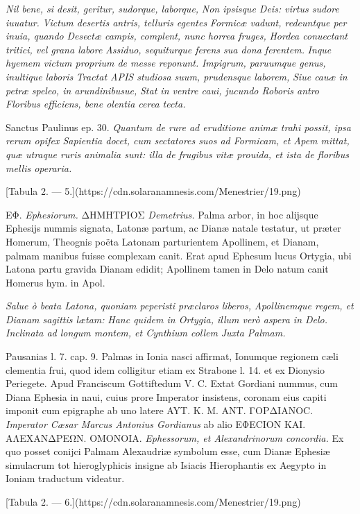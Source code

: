 \documentclass[a4paper, 11pt, oneside, polutonikogreek, latin]{article}
\begin{document}
\emph{Nil bene, si desit, geritur, sudorque, laborque,}
\emph{Non ipsisque Deis: virtus sudore iuuatur.}
\emph{Victum desertis antris, telluris egentes}
\emph{Formicæ vadunt, redeuntque per inuia, quando}
\emph{Desectæ campis, complent, nunc horrea fruges,}
\emph{Hordea conuectant tritici, vel grana labore}
\emph{Assiduo, sequiturque ferens sua dona ferentem.}
\emph{Inque hyemem victum proprium de messe reponunt.}
\emph{Impigrum, paruumque genus, inultique laboris}
\emph{Tractat APIS studiosa suum, prudensque laborem,}
\emph{Siue cauæ in petræ speleo, in arundinibusue,}
\emph{Stat in ventre caui, jucundo Roboris antro}
\emph{Floribus efficiens, bene olentia cerea tecta.}

Sanctus Paulinus ep. 30. \emph{Quantum de rure ad eruditione animæ trahi possit, ipsa rerum opifex Sapientia docet, cum sectatores suos ad Formicam, et Apem mittat, quæ utraque ruris animalia sunt: illa de frugibus vitæ prouida, et ista de floribus mellis operaria.}

[Tabula 2. --- 5.](https://cdn.solaranamnesis.com/Menestrier/19.png)

EΦ. \emph{Ephesiorum.} ΔHMHTPIOΣ \emph{Demetrius.} Palma arbor, in hoc alijsque Ephesijs nummis signata, Latonæ partum, ac Dianæ natale testatur, ut præter Homerum, Theognis poëta Latonam parturientem Apollinem, et Dianam, palmam manibus fuisse complexam canit. Erat apud Ephesum lucus Ortygia, ubi Latona partu gravida Dianam edidit; Apollinem tamen in Delo natum canit Homerus hym. in Apol.

\emph{Salue ò beata Latona, quoniam peperisti præclaros liberos,}
\emph{Apollinemque regem, et Dianam sagittis lætam:}
\emph{Hanc quidem in Ortygia, illum verò aspera in Delo.}
\emph{Inclinata ad longum montem, et Cynthium collem}
\emph{Juxta Palmam.}

Pausanias l. 7. cap. 9. Palmas in Ionia nasci affirmat, Ionumque regionem cæli clementia frui, quod idem colligitur etiam ex Strabone l. 14. et ex Dionysio Periegete. Apud Franciscum Gottiftedum V. C. Extat Gordiani nummus, cum Diana Ephesia in naui, cuius prore Imperator insistens, coronam eius capiti imponit cum epigraphe ab uno latere AYT. K. M. ANT. ΓOPΔIANOC. \emph{Imperator Cæsar Marcus Antonius Gordianus} ab alio EΦECION KAI. AΛEXANΔPEΩN. OMONOIA. \emph{Ephessorum, et Alexandrinorum concordia.} Ex quo posset conijci Palmam Alexaudriæ symbolum esse, cum Dianæ Ephesiæ simulacrum tot hieroglyphicis insigne ab Isiacis Hierophantis ex Aegypto in Ioniam traductum videatur.

[Tabula 2. --- 6.](https://cdn.solaranamnesis.com/Menestrier/19.png)
\end{document}

